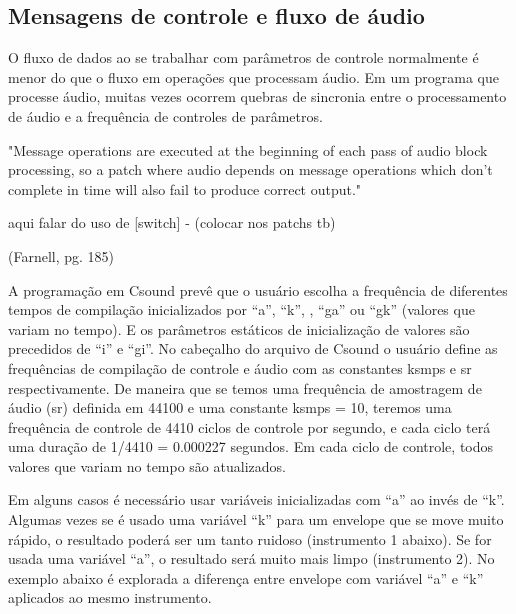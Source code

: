\documentclass{ppgmus}
\begin{document}

\subsection{Mensagens de controle e fluxo de áudio}

O fluxo de dados ao se trabalhar com parâmetros de controle
normalmente é menor do que o fluxo em operações
que processam áudio. Em um programa que processe áudio, 
muitas vezes ocorrem quebras de sincronia entre o processamento
de áudio e a frequência de controles de parâmetros.

"Message operations are executed at the beginning of each pass of audio
block processing, so a patch where audio depends on message operations
which don't complete in time will also fail to produce correct output."

aqui falar do uso de [switch\texttildelow] - (colocar nos patchs tb)

(Farnell, pg. 185)



A programação em Csound prevê que o usuário escolha a frequência
de diferentes tempos de compilação inicializados por ``a'', ``k'',
, ``ga'' ou ``gk'' (valores que variam no tempo). E os parâmetros 
 estáticos de inicialização de valores são precedidos
de ``i'' e ``gi''. No cabeçalho do arquivo de Csound o usuário define as 
frequências de compilação de controle e áudio com as constantes ksmps e sr respectivamente.
De maneira que se temos uma frequência de amostragem de áudio (sr) definida em
44100 e uma constante ksmps = 10, teremos uma frequência de controle de 4410 ciclos
de controle por segundo, e cada ciclo terá uma duração de 1/4410 = 0.000227 segundos. 
Em cada ciclo de controle, todos valores que variam no tempo são atualizados.

Em alguns casos é necessário usar variáveis inicializadas com ``a'' ao invés de ``k''. Algumas vezes 
se é usado uma variável ``k'' para um envelope que se move muito rápido, o resultado poderá ser
um tanto ruidoso (instrumento 1 abaixo). Se for usada uma variável ``a'', o resultado será 
muito mais limpo (instrumento 2). No exemplo abaixo é explorada a diferença
entre envelope com variável ``a'' e ``k'' aplicados ao mesmo instrumento.
\end{document}
